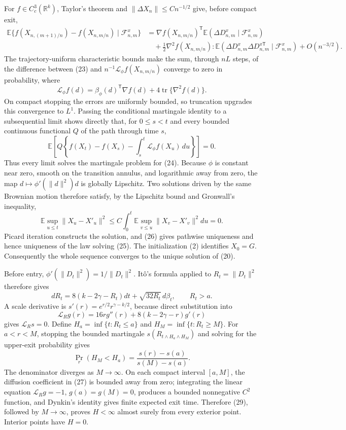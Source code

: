 For \(f\in C_c^3(\mathbb R^k)\), Taylor's theorem and \(\|\Delta X_n\|\le Cn^{-1/2}\) give, before compact exit,
\[
 \begin{split}
 \mathbb E\{f(X_{n,(m+1)/n})-f(X_{n,m/n})\mid\mathcal F^x_{n,m}\}
 &=\nabla f(X_{n,m/n})^{\mathsf T}\mathbb E(\Delta D^x_{n,m}\mid\mathcal F^x_{n,m})\\
 &\quad+\frac12\nabla^2f(X_{n,m/n}):
 \mathbb E(\Delta D^x_{n,m}\Delta D^{x\mathsf T}_{n,m}\mid\mathcal F^x_{n,m})+O(n^{-3/2}).
 \end{split} \tag{23}
\]
The trajectory-uniform characteristic bounds make the sum, through \(nL\) steps, of the difference between (23) and \(n^{-1}\mathcal L_\phi f(X_{n,m/n})\) converge to zero in probability, where
\[
 \mathcal L_\phi f(d)=\beta_\phi(d)^{\mathsf T}\nabla f(d)+4\operatorname{tr}\{\nabla^2f(d)\}. \tag{24}
\]
On compact stopping the errors are uniformly bounded, so truncation upgrades this convergence to \(L^1\).  Passing the conditional martingale identity to a subsequential limit shows directly that, for \(0\le s<t\) and every bounded continuous functional \(Q\) of the path through time \(s\),
\[
 \mathbb E\left[Q\left\{f(X_t)-f(X_s)-\int_s^t\mathcal L_\phi f(X_u)\,du\right\}\right]=0. \tag{25}
\]
Thus every limit solves the martingale problem for (24).  Because \(\phi\) is constant near zero, smooth on the transition annulus, and logarithmic away from zero, the map \(d\mapsto\phi'(\|d\|^2)d\) is globally Lipschitz.  Two solutions driven by the same Brownian motion therefore satisfy, by the Lipschitz bound and Gronwall's inequality,
\[
 \mathbb E\sup_{u\le t}\|X_u-X'_u\|^2\le C\int_0^t\mathbb E\sup_{v\le u}\|X_v-X'_v\|^2du=0. \tag{26}
\]
Picard iteration constructs the solution, and (26) gives pathwise uniqueness and hence uniqueness of the law solving (25).  The initialization (2) identifies \(X_0=G\).  Consequently the whole sequence converges to the unique solution of (20).

Before entry, \(\phi'(\|D_t\|^2)=1/\|D_t\|^2\).  It\^o's formula applied to \(R_t=\|D_t\|^2\) therefore gives
\[
 dR_t=8(k-2\gamma-R_t)dt+\sqrt{32R_t}\,d\beta_t,
 \qquad R_t>a. \tag{27}
\]
A scale derivative is \(s'(r)=e^{r/2}r^{\gamma-k/2}\), because direct substitution into
\[
 \mathcal L_Rg(r)=16r g''(r)+8(k-2\gamma-r)g'(r) \tag{28}
\]
gives \(\mathcal L_Rs=0\).  Define \(H_a=\inf\{t:R_t\le a\}\) and \(H_M=\inf\{t:R_t\ge M\}\).  For \(a<r<M\), stopping the bounded martingale \(s(R_{t\wedge H_a\wedge H_M})\) and solving for the upper-exit probability gives
\[
 \Pr_r(H_M<H_a)=\frac{s(r)-s(a)}{s(M)-s(a)}. \tag{29}
\]
The denominator diverges as \(M\to\infty\).  On each compact interval \([a,M]\), the diffusion coefficient in (27) is bounded away from zero; integrating the linear equation \(\mathcal L_Rg=-1\), \(g(a)=g(M)=0\), produces a bounded nonnegative \(C^2\) function, and Dynkin's identity gives finite expected exit time.  Therefore (29), followed by \(M\to\infty\), proves \(H<\infty\) almost surely from every exterior point.  Interior points have \(H=0\).

